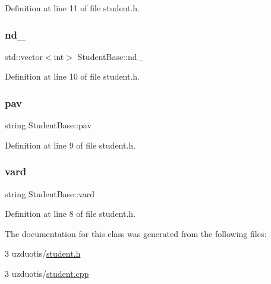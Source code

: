 Definition at line 11 of file student.\+h.

\mbox{\label{class_student_base_ab55fd8db43909de908c66ed7f3bdd4e6}} 
\subsubsection{\texorpdfstring{nd\_}{nd\_}}
{\footnotesize\ttfamily std\+::vector$<$int$>$ Student\+Base\+::nd\+\_\+\hspace{0.3cm}{\ttfamily [protected]}}



Definition at line 10 of file student.\+h.

\mbox{\label{class_student_base_abdccea3079f2c5df94f35525d4c5c75d}} 
\subsubsection{\texorpdfstring{pav}{pav}}
{\footnotesize\ttfamily string Student\+Base\+::pav\hspace{0.3cm}{\ttfamily [protected]}}



Definition at line 9 of file student.\+h.

\mbox{\label{class_student_base_a43bacd79e942bdf9d2fb984d08edf454}} 
\subsubsection{\texorpdfstring{vard}{vard}}
{\footnotesize\ttfamily string Student\+Base\+::vard\hspace{0.3cm}{\ttfamily [protected]}}



Definition at line 8 of file student.\+h.



The documentation for this class was generated from the following files\+:\begin{DoxyCompactItemize}
\item 
3 uzduotis/\mbox{\hyperlink{student_8h}{student.\+h}}\item 
3 uzduotis/\mbox{\hyperlink{student_8cpp}{student.\+cpp}}\end{DoxyCompactItemize}
